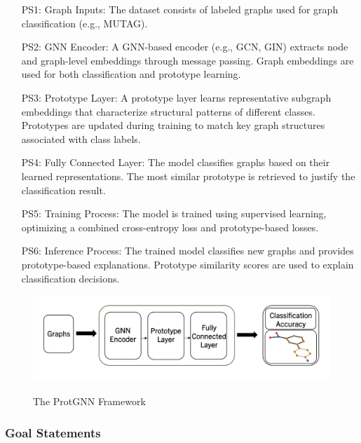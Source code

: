 \documentclass[12pt]{article}
\begin{document}
\begin{itemize}

    \item[PS1:] Graph Inputs: The dataset consists of labeled graphs used for graph classification (e.g., MUTAG).

    \item[PS2:] GNN Encoder: A GNN-based encoder (e.g., GCN, GIN) extracts node and graph-level embeddings through message passing. Graph embeddings are used for both classification and prototype learning.

    \item[PS3:] Prototype Layer: A prototype layer learns representative subgraph embeddings that characterize structural patterns of different classes. Prototypes are updated during training to match key graph structures associated with class labels.

    \item[PS4:] Fully Connected Layer: The model classifies graphs based on their learned representations. The most similar prototype is retrieved to justify the classification result.

    \item[PS5:] Training Process: The model is trained using supervised learning, optimizing a combined cross-entropy loss and prototype-based losses.

    \item[PS6:] Inference Process: The trained model classifies new graphs and provides prototype-based explanations. Prototype similarity scores are used to explain classification decisions.

\end{itemize}


\begin{figure}[h!]
\begin{center}
{
  \includegraphics[width=1\textwidth]{PhysicalSystem.png}
 }
     \caption{\label{PS_Figure} The ProtGNN Framework}
 \end{center}
 \end{figure}

\subsubsection{Goal Statements} \label{sec_goals}
\end{document}
